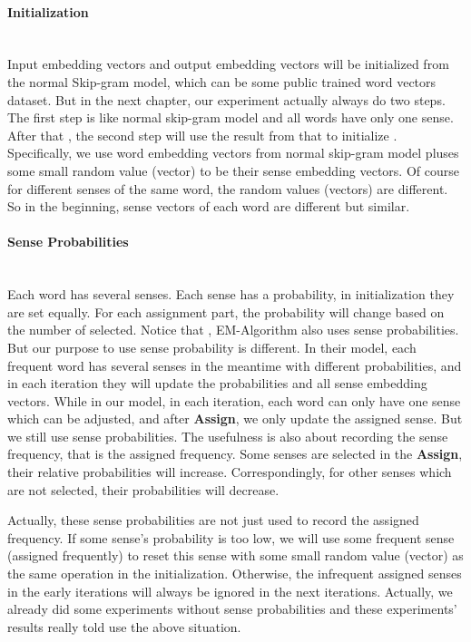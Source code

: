 \paragraph{Initialization}\ \\
Input embedding vectors and output embedding vectors will be initialized from the normal Skip-gram model, which can be some public trained word vectors dataset. But in the next chapter, our experiment actually always do two steps. The first step is like normal skip-gram model and all words have only one sense. After that , the second step will use the result from that to initialize . Specifically, we use word embedding vectors from normal skip-gram model pluses some small random value (vector) to be their sense embedding vectors. Of course for different senses of the same word, the random values (vectors) are different. So in the beginning, sense vectors of each word are different but similar.


\paragraph{Sense Probabilities}\ \\
Each word has several senses. Each sense has a probability, in initialization they are set equally. For each assignment part, the probability will change based on the number of selected. Notice that , EM-Algorithm also uses sense probabilities. But our purpose to use sense probability is different. In their model, each frequent word has several senses in the meantime  with different probabilities, and in each iteration they will update the probabilities and all sense embedding vectors. While in our model, in each iteration, each word can only have one sense which can be adjusted, and after \textbf{Assign}, we only update the assigned sense. But we still use sense probabilities. The usefulness is also about recording the sense frequency, that is the assigned frequency. Some senses are selected in the \textbf{Assign}, their relative probabilities will increase. Correspondingly, for other senses which are not selected, their probabilities will decrease. 

Actually, these sense probabilities are not just used to record the assigned frequency. If some sense's probability is too low, we will use some frequent sense (assigned frequently) to reset this sense with some small random value (vector) as the same operation in the initialization. Otherwise, the infrequent assigned senses in the early iterations will always be ignored in the next iterations. Actually, we already did some experiments without sense probabilities and these experiments' results really told use the above situation. \\


